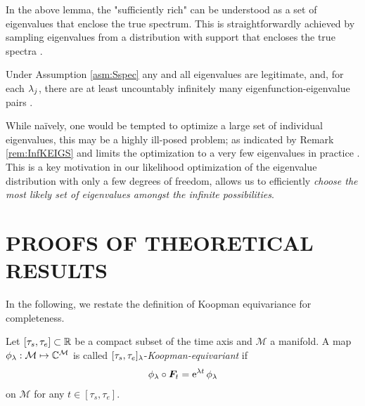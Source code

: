 In the above lemma, the "sufficiently rich" can be understood as a set of eigenvalues that enclose the true spectrum. This is straightforwardly achieved by sampling eigenvalues from a distribution with support that encloses the true spectra \citep[Proposition 3]{KKR_neurips2023}.

\begin{remark}\label{rem:InfKEIGS}
    Under Assumption \ref{asm:Sspec} any and all eigenvalues are legitimate, and, for each $\lambda_j$, there are at least uncountably infinitely many eigenfunction-eigenvalue pairs \citep[Corollary 3]{Bollt2021GeometricRepresentation}.
\end{remark}

While na\"{i}vely, one would be tempted to optimize a large set of individual eigenvalues, this may be a highly ill-posed problem; as indicated by  Remark \ref{rem:InfKEIGS} and limits the optimization to a very few eigenvalues in practice \citep{Korda2020OptimalControl,caldarelli2024linear}. This is a key motivation in our likelihood optimization of the eigenvalue distribution with only a few degrees of freedom, allows us to efficiently \textit{choose the most likely set of eigenvalues amongst the infinite possibilities}.





















\section{PROOFS OF THEORETICAL RESULTS}\label{supl:Proof}

In the following, we restate the definition of Koopman equivariance for completeness.

\begin{definition}
    Let $[\tau_s,\tau_e] \subset \mathbb{R}$ be a compact subset of the time axis and $\mathcal{M}$ a manifold. 
    A map $\phi_{\lambda}: \mathcal{M} \mapsto \mathbb{C}^\mathcal{M}$ is called $ [\tau_s,\tau_e]_{\lambda}$-{\em Koopman-equivariant} if 
    \begin{align}
        \phi_{\lambda}\circ\bm{F}_t=\operatorname{e}^{\lambda t} \phi_\lambda
    \end{align}
    on $\mathcal{M}$ for any $t \in [\tau_s,\tau_e]$.
\end{definition}

